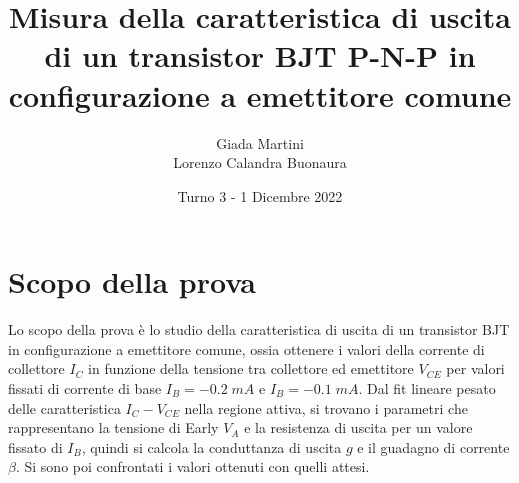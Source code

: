 \documentclass[a4paper, 11pt]{article}
\title{\textbf{Misura della caratteristica di uscita di un transistor BJT P-N-P in configurazione a emettitore comune}}
\author{Giada Martini \\ Lorenzo Calandra Buonaura}
\date{Turno 3 - 1 Dicembre 2022}
\begin{document}
\maketitle

\section{Scopo della prova}
Lo scopo della prova è lo studio della caratteristica di uscita di un transistor BJT in configurazione a emettitore comune, ossia ottenere i valori della corrente di collettore $I_C$ in funzione della tensione tra collettore ed emettitore $V_{CE}$  per valori fissati di corrente di base $I_B = -0.2 \; mA $ e $I_B = -0.1 \; mA$. Dal fit lineare pesato delle caratteristica $I_C-V_{CE}$ nella regione attiva, si trovano i parametri che rappresentano la tensione di Early $V_A$ e la resistenza di uscita per un valore fissato di $I_B$, quindi si calcola la conduttanza di uscita $g$ e il guadagno di corrente $\beta$. Si sono poi confrontati i valori ottenuti con quelli attesi.
\end{document}
